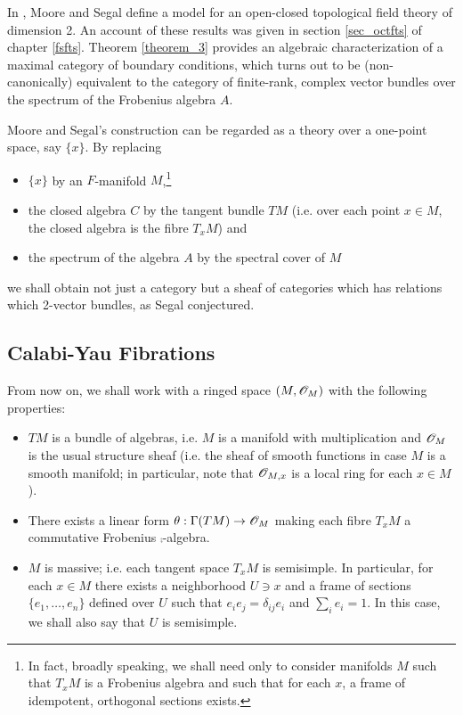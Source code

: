 In \cite{moore_segal1}, Moore and Segal define a model for an
open-closed topological field theory of dimension 2. An account of
these results was given in section \ref{sec_octfts} of chapter
\ref{fsfts}. Theorem \ref{theorem_3} provides an algebraic
characterization of a maximal category of boundary conditions, which turns
out to be (non-canonically) equivalent to the category of finite-rank, complex vector bundles over the spectrum of the Frobenius algebra $A$.

Moore and Segal's construction can be regarded as a theory over a one-point space, say $\{x\}$. By replacing
\begin{itemize}
\item $\{x\}$ by an $F$-manifold $M$,\footnote{In fact, broadly speaking, we shall need only to consider manifolds $M$ such that $T_xM$ is a Frobenius algebra and such that for each $x$, a frame of idempotent, orthogonal sections exists.}
\item the closed algebra $C$ by the tangent bundle $TM$ (i.e. over each point $x\in M$, the closed algebra is the fibre $T_xM$) and
\item the spectrum of the algebra $A$ by the spectral cover of $M$
\end{itemize}
we shall obtain not just a category but a sheaf of categories which has relations which 2-vector bundles, as Segal conjectured. 


\subsection{Calabi-Yau Fibrations}

From now on, we shall work with a ringed space $(M,\mathscr{O}_M)$ with the following properties:

\begin{itemize}
\item $TM$ is a bundle of algebras, i.e. $M$ is a manifold with multiplication and $\mathscr{O}_M$ is the usual structure sheaf (i.e. the sheaf of smooth functions in case $M$ is a smooth manifold; in particular, note that $\mathscr{O}_{M,x}$ is a local ring for each $x\in M$).
\item There exists a linear form $\theta :\Gamma(TM)\to \mathscr{O}_M$ making each fibre $T_xM$ a commutative Frobenius $\comp$-algebra.
\item $M$ is massive; i.e. each tangent space $T_xM$ is semisimple. In particular, for each $x\in M$ there exists a neighborhood $U\ni x$ and a frame of sections $\{e_1,\dots ,e_n\}$ defined over $U$ such that $e_ie_j=\delta_{ij}e_i$ and $\sum_i e_i=1$. In this case, we shall also say that $U$ is semisimple.
\end{itemize}

